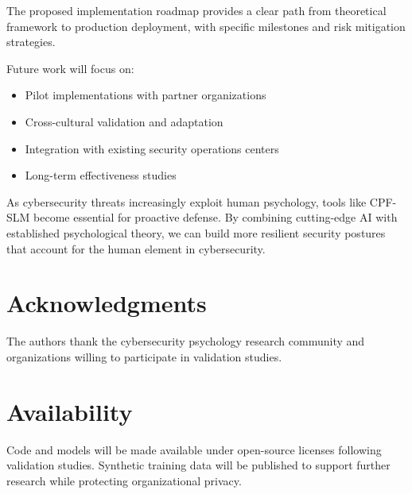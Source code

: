 \documentclass[11pt,a4paper]{article}
\begin{document}
The proposed implementation roadmap provides a clear path from theoretical framework to production deployment, with specific milestones and risk mitigation strategies.

Future work will focus on:
\begin{itemize}
\item Pilot implementations with partner organizations
\item Cross-cultural validation and adaptation
\item Integration with existing security operations centers
\item Long-term effectiveness studies
\end{itemize}

As cybersecurity threats increasingly exploit human psychology, tools like CPF-SLM become essential for proactive defense. By combining cutting-edge AI with established psychological theory, we can build more resilient security postures that account for the human element in cybersecurity.

\section*{Acknowledgments}

The authors thank the cybersecurity psychology research community and organizations willing to participate in validation studies.

\section*{Availability}

Code and models will be made available under open-source licenses following validation studies. Synthetic training data will be published to support further research while protecting organizational privacy.
\end{document}
